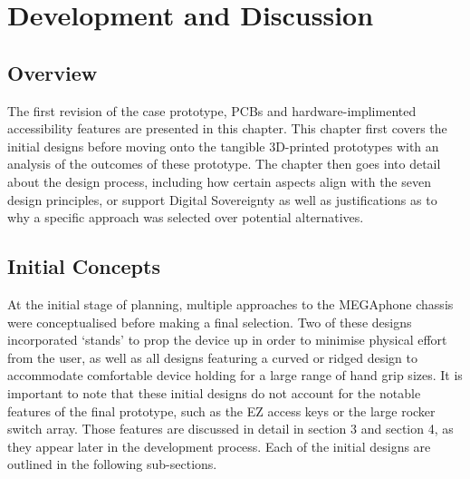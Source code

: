 
\chapter{Development and Discussion} %

\label{Chapter4} %

\section{Overview} %

The first revision of the case prototype, PCBs and hardware-implimented accessibility features are presented in this chapter.
This chapter first covers the initial designs before moving onto the tangible 3D-printed prototypes with an analysis of the outcomes of these prototype.
The chapter then goes into detail about the design process, including how certain aspects align with the seven design principles, or support Digital Sovereignty as well as justifications as to why a specific approach was selected over potential alternatives.

\section{Initial Concepts}

At the initial stage of planning, multiple approaches to the MEGAphone chassis were conceptualised before making a final selection.
Two of these designs incorporated ‘stands’ to prop the device up in order to minimise physical effort from the user, as well as all designs featuring a curved or ridged design to accommodate comfortable device holding for a large range of hand grip sizes. 
It is important to note that these initial designs do not account for the notable features of the final prototype, such as the EZ access keys or the large rocker switch array.
Those features are discussed in detail in section 3 and section 4, as they appear later in the development process.
Each of the initial designs are outlined in the following sub-sections.

